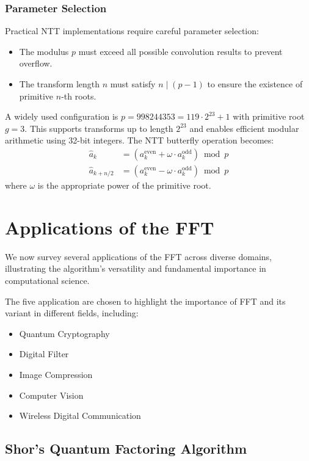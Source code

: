 \documentclass[a4paper]{article}
\theoremstyle{definition}
\begin{document}
\subsubsection{Parameter Selection}

Practical NTT implementations require careful parameter selection:
\begin{itemize}
    \item The modulus $p$ must exceed all possible convolution results to prevent overflow.
    \item The transform length $n$ must satisfy $n \mid (p-1)$ to ensure the existence of primitive $n$-th roots.
\end{itemize}

A widely used configuration is $p = 998244353 = 119 \cdot 2^{23} + 1$ with primitive root $g = 3$. This supports transforms up to length $2^{23}$ and enables efficient modular arithmetic using 32-bit integers. The NTT butterfly operation becomes:
\begin{align*}
\hat{a}_k &= \left(a_k^{\text{even}} + \omega \cdot a_k^{\text{odd}}\right) \bmod p \\
\hat{a}_{k+n/2} &= \left(a_k^{\text{even}} - \omega \cdot a_k^{\text{odd}}\right) \bmod p
\end{align*}
where $\omega$ is the appropriate power of the primitive root.

\section{Applications of the FFT}\label{sec:applications}

We now survey several applications of the FFT across diverse domains, illustrating the algorithm's versatility and fundamental importance in computational science.

The five application are chosen to highlight the importance of FFT and its variant in different fields, including: 
\begin{itemize}
    \item Quantum Cryptography 
    \item Digital Filter
    \item Image Compression 
    \item Computer Vision 
    \item Wireless Digital Communication
\end{itemize}

\subsection{Shor's Quantum Factoring Algorithm}
\end{document}
